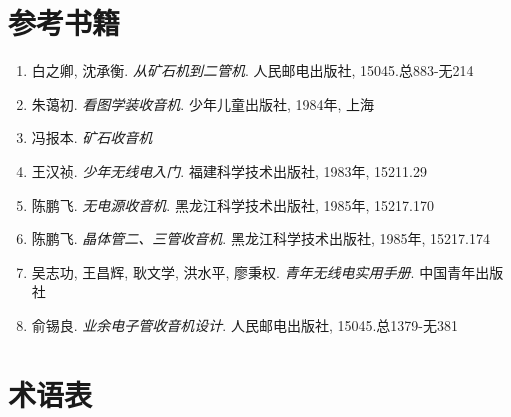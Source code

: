 \documentclass[12pt,UTF8]{ctexbook}
\begin{document}
\backmatter

\chapter{参考书籍}

\begin{enumerate}[leftmargin=3.5em]
    \item 白之卿, 沈承衡. \textit{从矿石机到二管机}. 人民邮电出版社, 15045.总883-无214
    \item 朱蔼初. \textit{看图学装收音机}. 少年儿童出版社, 1984年, 上海
    \item 冯报本. \textit{矿石收音机}
    \item 王汉祯. \textit{少年无线电入门}. 福建科学技术出版社, 1983年, 15211.29
    \item 陈鹏飞. \textit{无电源收音机}. 黑龙江科学技术出版社, 1985年, 15217.170
    \item 陈鹏飞. \textit{晶体管二、三管收音机}. 黑龙江科学技术出版社, 1985年, 15217.174
    \item 吴志功, 王昌辉, 耿文学, 洪水平, 廖秉权. \textit{青年无线电实用手册}. 中国青年出版社
    \item 俞锡良. \textit{业余电子管收音机设计}. 人民邮电出版社, 15045.总1379-无381
\end{enumerate}

\chapter{术语表}
\end{document}
